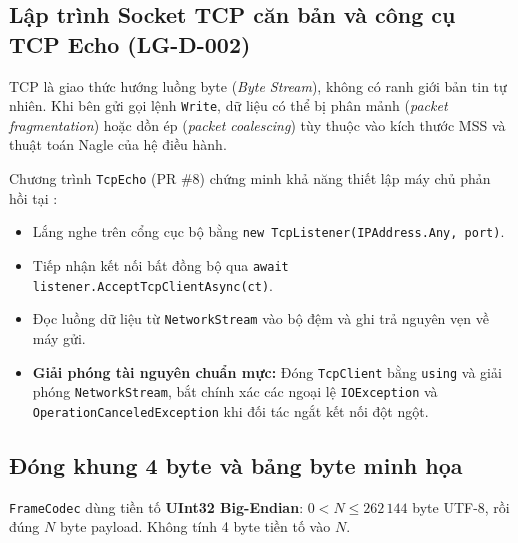 \documentclass[12pt,a4paper]{article}
\begin{document}
\subsection{Lập trình Socket TCP căn bản và công cụ TCP Echo (LG-D-002)}
TCP là giao thức hướng luồng byte (\textit{Byte Stream}), không có ranh giới bản tin tự nhiên. Khi bên gửi gọi lệnh \texttt{Write}, dữ liệu có thể bị phân mảnh (\textit{packet fragmentation}) hoặc dồn ép (\textit{packet coalescing}) tùy thuộc vào kích thước MSS và thuật toán Nagle của hệ điều hành.

Chương trình \texttt{TcpEcho} (PR \#8) chứng minh khả năng thiết lập máy chủ phản hồi tại :
\begin{itemize}
  \item Lắng nghe trên cổng cục bộ bằng \texttt{new TcpListener(IPAddress.Any, port)}.
  \item Tiếp nhận kết nối bất đồng bộ qua \texttt{await listener.AcceptTcpClientAsync(ct)}.
  \item Đọc luồng dữ liệu từ \texttt{NetworkStream} vào bộ đệm và ghi trả nguyên vẹn về máy gửi.
  \item \textbf{Giải phóng tài nguyên chuẩn mực:} Đóng \texttt{TcpClient} bằng \texttt{using} và giải phóng \texttt{NetworkStream}, bắt chính xác các ngoại lệ \texttt{IOException} và \texttt{OperationCanceledException} khi đối tác ngắt kết nối đột ngột.
\end{itemize}

\subsection{Đóng khung 4 byte và bảng byte minh họa}
\label{sec:wire-example}
\texttt{FrameCodec} dùng tiền tố \textbf{UInt32 Big-Endian}: $0<N\le262\,144$ byte UTF-8, rồi đúng $N$ byte payload. Không tính 4 byte tiền tố vào $N$.
\end{document}
